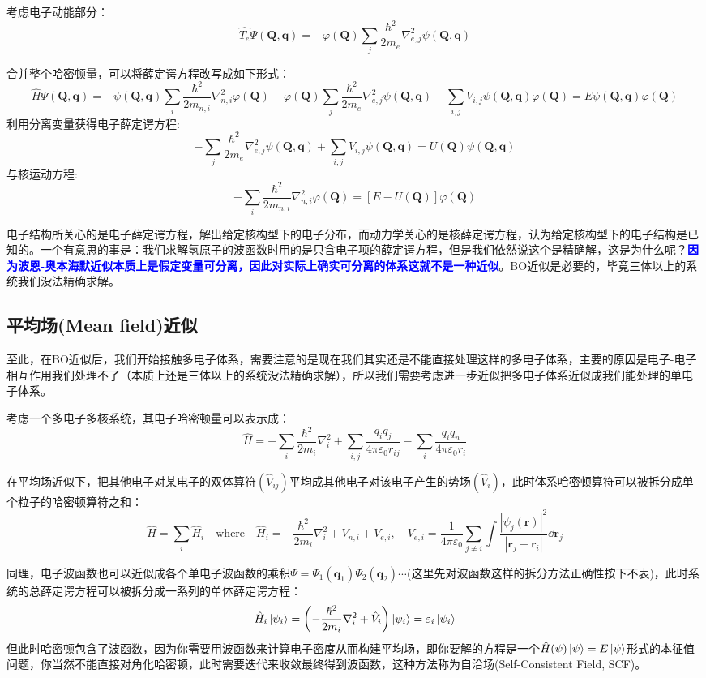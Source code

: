 考虑电子动能部分：
\[\hat{T_e}\varPsi(\bm{Q},\bm{q})=-\varphi(\bm{Q})\sum_j\frac{\hbar^2}{2m_e}\nabla^2_{e,j}\psi(\bm{Q},\bm{q})\]

合并整个哈密顿量，可以将薛定谔方程改写成如下形式：
\[\hat{H}\varPsi(\bm{Q},\bm{q})=-\psi(\bm{Q},\bm{q})\sum_i\frac{\hbar^2}{2m_{n,i}}\nabla^2_{n,i}\varphi(\bm{Q})-\varphi(\bm{Q})\sum_j\frac{\hbar^2}{2m_e}\nabla^2_{e,j}\psi(\bm{Q},\bm{q})+\sum_{i,j}V_{i,j}\psi(\bm{Q},\bm{q})\varphi(\bm{Q})=E\psi(\bm{Q},\bm{q})\varphi(\bm{Q})\]
利用分离变量获得电子薛定谔方程:
\[-\sum_j\frac{\hbar^2}{2m_e}\nabla^2_{e,j}\psi(\bm{Q},\bm{q})+\sum_{i,j}V_{i,j}\psi(\bm{Q},\bm{q})=U(\bm{Q})\psi(\bm{Q},\bm{q})\]
与核运动方程:
\[-\sum_i\frac{\hbar^2}{2m_{n,i}}\nabla^2_{n,i}\varphi(\bm{Q})=[E-U(\bm{Q})]\varphi(\bm{Q})\]

电子结构所关心的是电子薛定谔方程，解出给定核构型下的电子分布，而动力学关心的是核薛定谔方程，认为给定核构型下的电子结构是已知的。一个有意思的事是：我们求解氢原子的波函数时用的是只含电子项的薛定谔方程，但是我们依然说这个是精确解，这是为什么呢？\textcolor{blue}{\textbf{因为波恩-奥本海默近似本质上是假定变量可分离，因此对实际上确实可分离的体系这就不是一种近似}}。BO近似是必要的，毕竟三体以上的系统我们没法精确求解。

\subsection{平均场(Mean field)近似}
至此，在BO近似后，我们开始接触多电子体系，需要注意的是现在我们其实还是不能直接处理这样的多电子体系，主要的原因是电子-电子相互作用我们处理不了（本质上还是三体以上的系统没法精确求解），所以我们需要考虑进一步近似把多电子体系近似成我们能处理的单电子体系。

考虑一个多电子多核系统，其电子哈密顿量可以表示成：
\[\hat{H}=-\sum_{i}\frac{\hbar^2}{2m_i}\nabla^2_i+\sum_{i,j}\frac{q_iq_j}{4 \pi \varepsilon_0 r_{ij}}-\sum_i\frac{q_iq_n}{4 \pi \varepsilon_0 r_{i}}\]

在平均场近似下，把其他电子对某电子的双体算符$(\hat{V}_{ij})$平均成其他电子对该电子产生的势场$(\hat{V}_{i})$，此时体系哈密顿算符可以被拆分成单个粒子的哈密顿算符之和：
\[\hat{H}=\sum_{i}\hat{H}_{i} \quad \text{where} \quad \hat{H}_i=-\frac{\hbar^2}{2m_i}\nabla^2_i+V_{n,i}+V_{e,i}, \quad V_{e,i}=\frac{1}{4\pi\varepsilon_0}\sum_{j\neq i}\int\frac{|\psi_j(\bm{r})|^2}{|\bm{r}_j-\bm{r}_i|}\dd{\bm{r}_j}\]

同理，电子波函数也可以近似成各个单电子波函数的乘积$\varPsi=\varPsi_1(\bm{q}_1)\varPsi_2(\bm{q}_2)\cdots$(这里先对波函数这样的拆分方法正确性按下不表)，此时系统的总薛定谔方程可以被拆分成一系列的单体薛定谔方程：
\[\hat{H}_i\ket{\psi_i}=\left( -\frac{\hbar^2}{2m_i}\nabla^2_i+\hat{V}_i \right)\ket{\psi_i}=\varepsilon_i\ket{\psi_i}\]
但此时哈密顿包含了波函数，因为你需要用波函数来计算电子密度从而构建平均场，即你要解的方程是一个$\hat{H}(\psi)\ket{\psi}=E\ket{\psi}$形式的本征值问题，你当然不能直接对角化哈密顿，此时需要迭代来收敛最终得到波函数，这种方法称为自洽场(Self-Consistent Field, SCF)。
